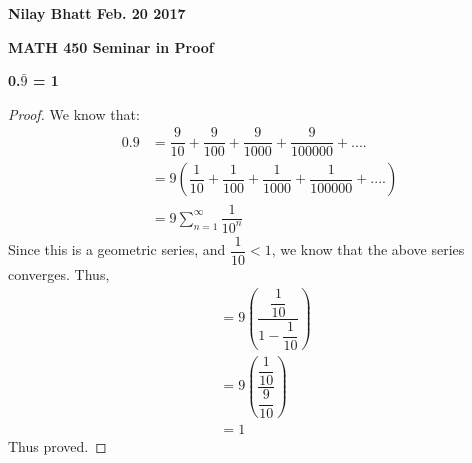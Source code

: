 \documentclass[12pt, fullpage]{article}
\begin{document}
\begin{flushleft}
\textbf{Nilay Bhatt Feb. 20 2017}		
\end{flushleft}

\begin{center}
{\bf MATH 450 Seminar in Proof}
\end{center}

\begin{center}
\textbf{0.$\bar{9}$ = 1}
\end{center}

\begin{proof}
We know that:
\begin{equation}
\begin{split}
0.9 &= \dfrac{9}{10} + \dfrac{9}{100} + \dfrac{9}{1000} + \dfrac{9}{100000} + ....\\
&= 9\left(\dfrac{1}{10} + \dfrac{1}{100} + \dfrac{1}{1000} + \dfrac{1}{100000} + ....\right)\\
&= 9 \sum_{n=1}^{\infty}\dfrac{1}{10^n}
\end{split}
\end{equation}
Since this is a geometric series, and $\dfrac{1}{10} < 1$, we know that the above series converges. Thus,\\
\begin{equation}
\begin{split}
&= 9 \left(\dfrac{\dfrac{1}{10}}{1-\dfrac{1}{10}}\right)\\
&= 9 \left(\dfrac{\dfrac{1}{10}}{\dfrac{9}{10}}\right) \\
&= 1
\end{split}
\end{equation}
Thus proved.

\end{proof}
\end{document}
